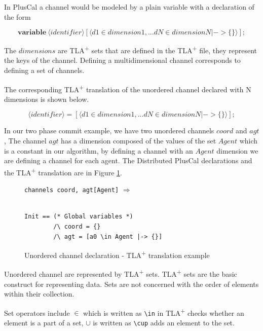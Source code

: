\documentclass{thesul}
\newcommand{\tlaplus}{TLA\textsuperscript{+}\xspace}
\newcommand{\keyword}[1]{\textbf{#1}}
\newcommand{\entity}[1]{\ensuremath{\langle}#1\ensuremath{\rangle}}
\begin{document}
In PlusCal a channel would be modeled by a plain variable with a declaration of the form

\[
 \keyword{variable}\ \entity{identifier}[\entity{d1 \in dimension1,... dN \in dimensionN |-> \{\}}];
\]

The $dimensions$ are \tlaplus sets that are defined in the \tlaplus file, they represent the keys of the channel. Defining a multidimensional channel corresponds to defining a set of channels.

The corresponding \tlaplus translation of the unordered channel declared with N dimensions is shown below.

\[
 \entity{identifier} = [\entity{d1 \in dimension1,... dN \in dimensionN |-> \{ \}}];
\]

In our two phase commit example, we have two unordered channels $coord$ and $agt$, The channel $agt$ has a dimension composed of the values of the set $Agent$ which is a constant in our algorithm, by defining a channel with an $Agent$ dimension we are defining a channel for each agent.
The Distributed PlusCal declarations and the \tlaplus translation are in Figure \ref{2pcchannels}.


\FloatBarrier
\begin{figure}[!h]

\begin{minipage}{.3\textwidth}

\lstinline|channels coord, agt[Agent]| $\Rightarrow$ \\\\
\end{minipage}\hfill
\begin{minipage}{.7\textwidth}
\begin{lstlisting}[frame = none, numbers = none]
Init == (* Global variables *)
        /\ coord = {}
        /\ agt = [a0 \in Agent |-> {}]
\end{lstlisting}

\end{minipage}\hfill

\caption{Unordered channel declaration - \tlaplus translation example}
\label{2pcchannels}
\end{figure}
\FloatBarrier

Unordered channel are represented by \tlaplus sets. \tlaplus sets are the basic construct for representing data. Sets are not concerned with the order of elements within their collection.

Set operators include $\in$ which is written as \lstinline|\in| in \tlaplus checks whether an element is a part of a set, $\cup$ is written as \lstinline|\cup| adds an element to the set.
\end{document}
